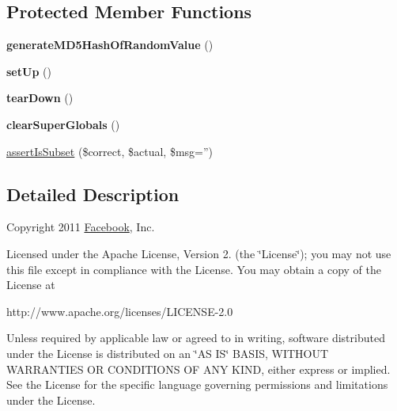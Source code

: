 \subsection*{Protected Member Functions}
\begin{DoxyCompactItemize}
\item 
\hypertarget{classPHPSDKTestCase_aa20695a503ea8ec7379627444fb58178}{{\bfseries generate\-M\-D5\-Hash\-Of\-Random\-Value} ()}\label{classPHPSDKTestCase_aa20695a503ea8ec7379627444fb58178}

\item 
\hypertarget{classPHPSDKTestCase_a66142e68c04271ff37150f2dcf180a9f}{{\bfseries set\-Up} ()}\label{classPHPSDKTestCase_a66142e68c04271ff37150f2dcf180a9f}

\item 
\hypertarget{classPHPSDKTestCase_a84b379cc54c24dcb1f8deb2c5b08827d}{{\bfseries tear\-Down} ()}\label{classPHPSDKTestCase_a84b379cc54c24dcb1f8deb2c5b08827d}

\item 
\hypertarget{classPHPSDKTestCase_a3809a78e0339db2e66ed31413d092b8f}{{\bfseries clear\-Super\-Globals} ()}\label{classPHPSDKTestCase_a3809a78e0339db2e66ed31413d092b8f}

\item 
\hyperlink{classPHPSDKTestCase_aa2fa68d8c85c185cae89c19403408f15}{assert\-Is\-Subset} (\$correct, \$actual, \$msg='')
\end{DoxyCompactItemize}


\subsection{Detailed Description}
Copyright 2011 \hyperlink{classFacebook}{Facebook}, Inc.

Licensed under the Apache License, Version 2. (the \char`\"{}\-License\char`\"{}); you may not use this file except in compliance with the License. You may obtain a copy of the License at \begin{DoxyVerb}http://www.apache.org/licenses/LICENSE-2.0
\end{DoxyVerb}


Unless required by applicable law or agreed to in writing, software distributed under the License is distributed on an \char`\"{}\-A\-S I\-S\char`\"{} B\-A\-S\-I\-S, W\-I\-T\-H\-O\-U\-T W\-A\-R\-R\-A\-N\-T\-I\-E\-S O\-R C\-O\-N\-D\-I\-T\-I\-O\-N\-S O\-F A\-N\-Y K\-I\-N\-D, either express or implied. See the License for the specific language governing permissions and limitations under the License. 

